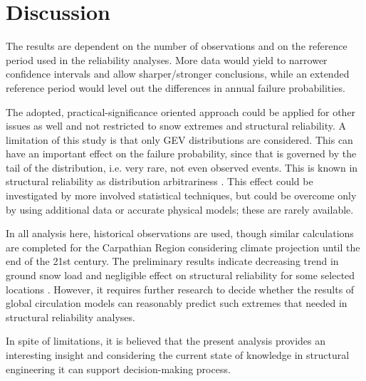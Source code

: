 \section{Discussion}
The results are dependent on the number of observations and on the reference period used in the reliability analyses. More data would yield to narrower confidence intervals and allow sharper/stronger conclusions, while an extended reference period would level out the differences in annual failure probabilities.

The adopted, practical-significance oriented approach could be applied for other issues as well and not restricted to snow extremes and structural reliability. A limitation of this study is that only GEV distributions are considered. This can have an important effect on the failure probability, since that is governed by the tail of the distribution, i.e. very rare, not even observed events. This is known in structural reliability as distribution arbitrariness \citep{Ditlevsen1994}. This effect could be investigated by more involved statistical techniques, but could be overcome only by using additional data or accurate physical models; these are rarely available.

In all analysis here, historical observations are used, though similar calculations are completed for the Carpathian Region considering climate projection until the end of the 21st century. The preliminary results indicate decreasing trend in ground snow load and negligible effect on structural reliability for some selected locations \citep{Kaman2014}. However, it requires further research to decide whether the results of global circulation models can reasonably predict such extremes that needed in structural reliability analyses. 

In spite of limitations, it is believed that the present analysis provides an interesting insight and considering the current state of knowledge in structural engineering it can support decision-making process.





